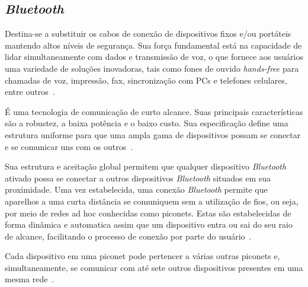 \subsection{\emph{Bluetooth}}

Destina-se a substituir os cabos de conexão de dispositivos fixos e/ou portáteis mantendo altos níveis de segurança. Sua força fundamental está na capacidade de lidar simultaneamente com dados e transmissão de voz, o que fornece aos usuários uma variedade de soluções inovadoras, tais como fones de ouvido \emph{hands-free} para chamadas de voz, impressão, fax, sincronização com PCs e telefones celulares, entre outros~\cite{bluetoothoverview}.

É uma tecnologia de comunicação de curto alcance. Suas principais características são a robustez, a baixa potência e o baixo custo. Sua especificação define uma estrutura uniforme para que uma ampla gama de dispositivos possam se conectar e se comunicar uns com os outros~\cite{bluetoothoverview}.

Sua estrutura e aceitação global permitem que qualquer dispositivo \emph{Bluetooth} ativado possa se conectar a outros dispositivos \emph{Bluetooth} situados em sua proximidade. Uma vez estabelecida, uma conexão \emph{Bluetooth} permite que aparelhos a uma curta distância se comuniquem sem a utilização de fios, ou seja, por meio de redes ad hoc conhecidas como piconets. Estas são estabelecidas de forma dinâmica e automatica assim que um dispositivo entra ou sai do seu raio de alcance, facilitando o processo de conexão por parte do usuário~\cite{bluetoothoverview}.

Cada dispositivo em uma piconet pode pertencer a várias outras piconets e, simultaneamente, se comunicar com até sete outros dispositivos presentes em uma mesma rede~\cite{bluetoothoverview}.
